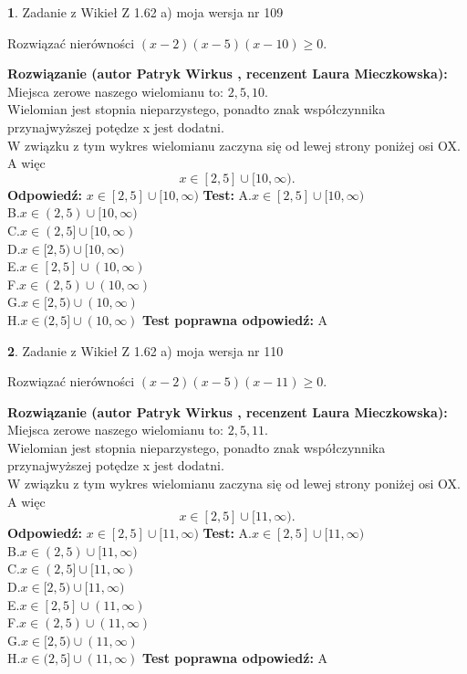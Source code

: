 \documentclass[12pt, a4paper]{article}
\theoremstyle{definition} %
\newtheorem{zad}{}
\newcommand{\zadStart}[1]{\begin{zad}#1\newline}
\newcommand{\zadStop}{\end{zad}}
\newcommand{\rozwStart}[2]{\noindent \textbf{Rozwiązanie (autor #1 , recenzent #2): }\newline}
\newcommand{\rozwStop}{\newline}
\newcommand{\odpStart}{\noindent \textbf{Odpowiedź:}\newline}
\newcommand{\odpStop}{\newline}
\newcommand{\testStart}{\noindent \textbf{Test:}\newline}
\newcommand{\testStop}{\newline}
\newcommand{\kluczStart}{\noindent \textbf{Test poprawna odpowiedź:}\newline}
\newcommand{\kluczStop}{\newline}
\begin{document}
\zadStart{Zadanie z Wikieł Z 1.62 a) moja wersja nr 109}

Rozwiązać nierówności $(x-2)(x-5)(x-10)\ge0$.
\zadStop
\rozwStart{Patryk Wirkus}{Laura Mieczkowska}
Miejsca zerowe naszego wielomianu to: $2, 5, 10$.\\
Wielomian jest stopnia nieparzystego, ponadto znak współczynnika przy\linebreak najwyższej potędze x jest dodatni.\\ W związku z tym wykres wielomianu zaczyna się od lewej strony poniżej osi OX. A więc $$x \in [2,5] \cup [10,\infty).$$
\rozwStop
\odpStart
$x \in [2,5] \cup [10,\infty)$
\odpStop
\testStart
A.$x \in [2,5] \cup [10,\infty)$\\
B.$x \in (2,5) \cup [10,\infty)$\\
C.$x \in (2,5] \cup [10,\infty)$\\
D.$x \in [2,5) \cup [10,\infty)$\\
E.$x \in [2,5] \cup (10,\infty)$\\
F.$x \in (2,5) \cup (10,\infty)$\\
G.$x \in [2,5) \cup (10,\infty)$\\
H.$x \in (2,5] \cup (10,\infty)$
\testStop
\kluczStart
A
\kluczStop



\zadStart{Zadanie z Wikieł Z 1.62 a) moja wersja nr 110}

Rozwiązać nierówności $(x-2)(x-5)(x-11)\ge0$.
\zadStop
\rozwStart{Patryk Wirkus}{Laura Mieczkowska}
Miejsca zerowe naszego wielomianu to: $2, 5, 11$.\\
Wielomian jest stopnia nieparzystego, ponadto znak współczynnika przy\linebreak najwyższej potędze x jest dodatni.\\ W związku z tym wykres wielomianu zaczyna się od lewej strony poniżej osi OX. A więc $$x \in [2,5] \cup [11,\infty).$$
\rozwStop
\odpStart
$x \in [2,5] \cup [11,\infty)$
\odpStop
\testStart
A.$x \in [2,5] \cup [11,\infty)$\\
B.$x \in (2,5) \cup [11,\infty)$\\
C.$x \in (2,5] \cup [11,\infty)$\\
D.$x \in [2,5) \cup [11,\infty)$\\
E.$x \in [2,5] \cup (11,\infty)$\\
F.$x \in (2,5) \cup (11,\infty)$\\
G.$x \in [2,5) \cup (11,\infty)$\\
H.$x \in (2,5] \cup (11,\infty)$
\testStop
\kluczStart
A
\kluczStop
\end{document}
